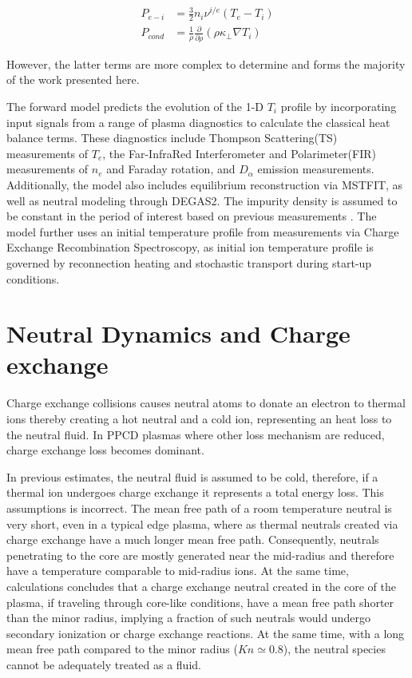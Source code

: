 \documentclass[aip, pop, preprint]{revtex4-1}
\begin{document}
\begin{align}\label{eqn:p_ei}
    P_{e-i} &= \frac{3}{2}n_i\nu^{i/e}(T_e - T_i)\\
    P_{cond} &= \frac{1}{\rho}\frac{\partial}{\partial\rho}(\rho\kappa_{\perp}\nabla T_{i})
\end{align}

However, the latter terms are more complex
to determine and forms the majority of the work presented here. 

The forward model predicts the evolution of the
1-D $T_i$ profile by incorporating input signals from a range of plasma
diagnostics to calculate the classical heat balance terms. These diagnostics include Thompson Scattering(TS) measurements of $T_e$\cite{Kubala2016UpgradesDiagnostic, DenHartog2010Pulse-burstScattering}, the Far-InfraRed Interferometer and Polarimeter(FIR) measurements of $n_e$ and
Faraday rotation\cite{Yates2008SimultaneousMST, Brower2001MultichannelPinch}, and $D_{\alpha}$ emission measurements. Additionally, the model also includes equilibrium reconstruction via MSTFIT\cite{Anderson2004EquilibriumPinch}, as well as neutral modeling through
DEGAS2\cite{Stotler1994Neutral2,Stotler1994Neutral2}. The impurity density is assumed to be constant in the period of
interest based on previous measurements \cite{Kumar2012a,Nornberg2018IncorporatingCharge}. The
model further uses an initial temperature profile from measurements via Charge Exchange Recombination Spectroscopy\cite{DenHartog2006Advancesinvited}, as initial ion temperature profile is governed by reconnection heating and stochastic transport during start-up conditions. 

\section{Neutral Dynamics and Charge exchange}\label{sec:neutral}

Charge exchange collisions causes neutral atoms to donate an electron to thermal ions thereby creating a hot neutral and a cold ion, representing an heat loss to the neutral fluid. In PPCD plasmas where other
loss mechanism are reduced, charge exchange loss becomes dominant. 

In previous estimates, the neutral fluid is assumed to be cold, therefore, if a
thermal ion undergoes charge exchange it represents a total energy loss. This
assumptions is incorrect. The mean free path of a room temperature neutral is
very short, even in a typical edge plasma, where as thermal neutrals created
via charge exchange have a much longer mean free path. Consequently, neutrals
penetrating to the core are mostly generated near the mid-radius and therefore
have a temperature comparable to mid-radius ions. At the same time,
calculations concludes that a charge exchange neutral created in the core of
the plasma, if traveling through core-like conditions, have a mean free path
shorter than the minor radius, implying a fraction of such neutrals would
undergo secondary ionization or charge exchange reactions.  At the same time,
with a long mean free path compared to the minor radius ($Kn \simeq 0.8$), the
neutral species cannot be adequately treated as a fluid. 
\end{document}
